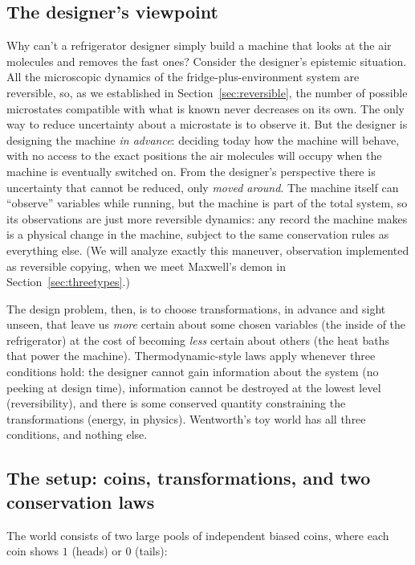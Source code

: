\documentclass[10pt]{article}
\theoremstyle{definition}
\theoremstyle{remark}
\begin{document}
\subsection{The designer's viewpoint}
\label{sec:designer}

Why can't a refrigerator designer simply build a machine that looks at the air molecules and removes the fast ones? Consider the designer's epistemic situation. All the microscopic dynamics of the fridge-plus-environment system are reversible, so, as we established in Section~\ref{sec:reversible}, the number of possible microstates compatible with what is known never decreases on its own. The only way to reduce uncertainty about a microstate is to observe it. But the designer is designing the machine \emph{in advance}: deciding today how the machine will behave, with no access to the exact positions the air molecules will occupy when the machine is eventually switched on. From the designer's perspective there is uncertainty that cannot be reduced, only \emph{moved around}. The machine itself can ``observe'' variables while running, but the machine is part of the total system, so its observations are just more reversible dynamics: any record the machine makes is a physical change in the machine, subject to the same conservation rules as everything else. (We will analyze exactly this maneuver, observation implemented as reversible copying, when we meet Maxwell's demon in Section~\ref{sec:threetypes}.)

The design problem, then, is to choose transformations, in advance and sight unseen, that leave us \emph{more} certain about some chosen variables (the inside of the refrigerator) at the cost of becoming \emph{less} certain about others (the heat baths that power the machine). Thermodynamic-style laws apply whenever three conditions hold: the designer cannot gain information about the system (no peeking at design time), information cannot be destroyed at the lowest level (reversibility), and there is some conserved quantity constraining the transformations (energy, in physics). Wentworth's toy world has all three conditions, and nothing else.

\subsection{The setup: coins, transformations, and two conservation laws}
\label{sec:coinsetup}

The world consists of two large pools of independent biased coins, where each coin shows $1$ (heads) or $0$ (tails):
\end{document}
